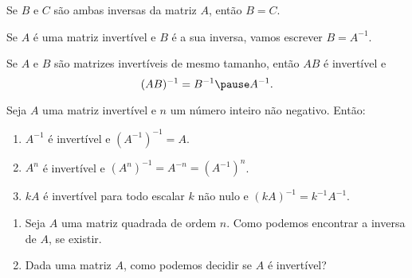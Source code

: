 \documentclass{beamer}
\begin{document}
    \begin{frame}
        \begin{teorema}
            Se $B$ e $C$ são ambas inversas da matriz $A$, \pause então $B = C$.\pause
        \end{teorema}

        \vspace{1cm}

        \begin{notacao}
            Se $A$ é uma matriz invertível \pause e $B$ é a sua inversa, \pause vamos escrever $B = A^{-1}$.
        \end{notacao}
    \end{frame}

    \begin{frame}
        \begin{proposicao}
            Se $A$ e $B$ são matrizes invertíveis de mesmo tamanho, \pause então $AB$ é invertível \pause e
            \[
                (AB)^{-1} = B^{-1}\pause A^{-1}.
            \]
        \end{proposicao}
    \end{frame}

    \begin{frame}
        \begin{proposicao}
            Seja $A$ uma matriz invertível \pause e $n$ um número inteiro não negativo. \pause Então:
            \begin{enumerate}[label={\roman*})]
                \item $A^{-1}$ é invertível \pause e $(A^{-1})^{-1} = A$.\pause

                \item $A^n$ é invertível \pause e $(A^n)^{-1} = A^{-n} = (A^{-1})^n$.\pause

                \item $kA$ é invertível \pause para todo escalar $k$ não nulo \pause e $(kA)^{-1} = k^{-1}A^{-1}$.
            \end{enumerate}
        \end{proposicao}
    \end{frame}

    \begin{frame}
        \begin{enumerate}[label={\arabic*})]
            \item Seja $A$ uma matriz quadrada de ordem $n$. \pause Como podemos encontrar a inversa de $A$, \pause se existir.\pause

            \vspace{1cm}

            \item Dada uma matriz $A$, \pause como podemos decidir se $A$ é invertível?\pause
        \end{enumerate}
    \end{frame}
\end{document}
